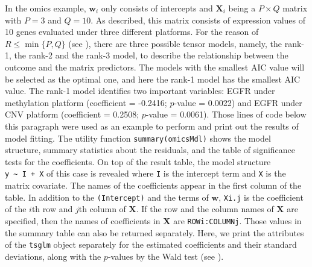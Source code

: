 In the omics example, \(\mathbf w_i\) only consists of intercepts and
\(\mathbf X_i\) being a \(P\times Q\) matrix with \(P=3\) and \(Q=10\).
As described, this matrix consists of expression values of 10 genes
evaluated under three different platforms. For the reason of
\(R\leq\min{\{P, Q\}}\) (see \citet{ChangYang2021bioinformatics}), there
are three possible tensor models, namely, the rank-1, the rank-2 and the
rank-3 model, to describe the relationship between the outcome and the
matrix predictors. The models with the smallest AIC value will be
selected as the optimal one, and here the rank-1 model has the smallest
AIC value. The rank-1 model identifies two important variables: EGFR
under methylation platform (coefficient = -0.2416; \(p\)-value = 0.0022)
and EGFR under CNV platform (coefficient = 0.2508; \(p\)-value =
0.0061). Those lines of code below this paragraph were used as an
example to perform and print out the results of model fitting. The
utility function \texttt{summary(omicsMdl)} shows the model structure,
summary statistics about the residuals, and the table of significance
tests for the coefficients. On top of the result table, the model
structure \texttt{y\ \textasciitilde{}\ I\ +\ X} of this case is
revealed where \texttt{I} is the intercept term and \texttt{X} is the
matrix covariate. The names of the coefficients appear in the first
column of the table. In addition to the \texttt{(Intercept)} and the
terms of \(\mathbf{w}\), \texttt{Xi.j} is the coefficient of the \(i\)th
row and \(j\)th column of \(\mathbf{X}\). If the row and the column
names of \(\mathbf{X}\) are specified, then the names of coefficients in
\(\mathbf{X}\) are \texttt{ROWi:COLUMNj}. Those values in the summary
table can also be returned separately. Here, we print the attributes of
the \texttt{tsglm} object separately for the estimated coefficients and
their standard deviations, along with the \(p\)-values by the Wald test
(see \citet{Wald1943tams}).

